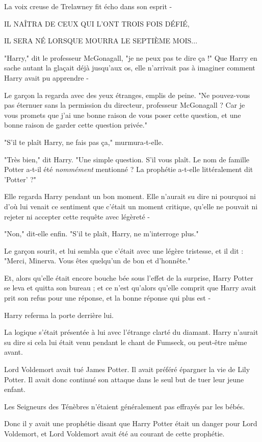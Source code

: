 La voix creuse de Trelawney fit écho dans son esprit -

IL NAÎTRA DE CEUX QUI L'ONT TROIS FOIS DÉFIÉ,

IL SERA NÉ LORSQUE MOURRA LE SEPTIÈME MOIS...

"Harry," dit le professeur McGonagall, "je ne peux pas te dire ça !" Que Harry en sache autant la glaçait déjà jusqu'aux os, elle n'arrivait pas à imaginer comment Harry avait pu apprendre -

Le garçon la regarda avec des yeux étranges, emplis de peine. "Ne pouvez-vous pas éternuer sans la permission du directeur, professeur McGonagall ? Car je vous promets que j'ai une bonne raison de vous poser cette question, et une bonne raison de garder cette question privée."

"S'il te plaît Harry, ne fais pas ça," murmura-t-elle.

"Très bien," dit Harry. "Une simple question. S'il vous plaît. Le nom de famille Potter a-t-il été \emph{nommément}  mentionné ? La prophétie a-t-elle littéralement dit 'Potter' ?"

Elle regarda Harry pendant un bon moment. Elle n'aurait su dire ni pourquoi ni d'où lui venait ce sentiment que c'était un moment critique, qu'elle ne pouvait ni rejeter ni accepter cette requête avec légèreté -

"Non," dit-elle enfin. "S'il te plaît, Harry, ne m'interroge plus."

Le garçon sourit, et lui sembla que c'était avec une légère tristesse, et il dit : "Merci, Minerva. Vous êtes quelqu'un de bon et d'honnête."

Et, alors qu'elle était encore bouche bée sous l'effet de la surprise, Harry Potter se leva et quitta son bureau ; et ce n'est qu'alors qu'elle comprit que Harry avait prit son refus pour une réponse, et la bonne réponse qui plus est -

Harry referma la porte derrière lui.

La logique s'était présentée à lui avec l'étrange clarté du diamant. Harry n'aurait su dire si cela lui était venu pendant le chant de Fumseck, ou peut-être même avant.

Lord Voldemort avait tué James Potter. Il avait préféré épargner la vie de Lily Potter. Il avait donc continué son attaque dans le seul but de tuer leur jeune enfant.

Les Seigneurs des Ténèbres n'étaient généralement pas effrayés par les bébés.

Donc il y avait une prophétie disant que Harry Potter était un danger pour Lord Voldemort, et Lord Voldemort avait été au courant de cette prophétie.

